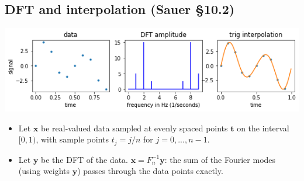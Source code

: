 \documentclass[12pt,letterpaper,noanswers]{exam}
\newcommand{\vc}[1]{\boldsymbol{#1}}
\begin{document}



\subsection*{DFT and interpolation (Sauer \S 10.2)}
\includegraphics[width=0.8\linewidth]{img/C20interp.png}
\begin{tcolorbox}
\begin{itemize}
\itemsep0pt
    \item Let $\vc{x}$ be real-valued data sampled at evenly spaced points $\vc{t}$ on the interval $[0,1)$, with sample points $t_j = j/n$ for $j=0,...,n-1$.
    \item Let $\vc{y}$ be the DFT of the data.  $\vc{x} = F_n^{-1}\vc{y}$: the sum of the Fourier modes (using weights $\vc{y}$) passes through the data points exactly.
\end{itemize}
\end{tcolorbox}
\end{document}
